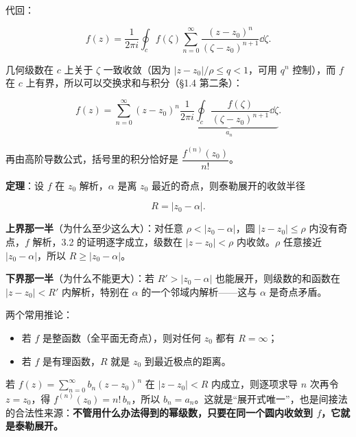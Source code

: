 \documentclass[11pt]{ctexart}
\let\origsubhdr\subhdr
\renewcommand{\subhdr}[1]{\par\needspace{4\baselineskip}\origsubhdr{#1}}
\begin{document}
代回：

\[ f(z)=\frac{1}{2\pi i}\oint_c f(\zeta)\sum_{n=0}^{\infty}\frac{(z-z_0)^n}{(\zeta-z_0)^{n+1}}\dd\zeta . \]

几何级数在 $c$ 上关于 $\zeta$ 一致收敛（因为 $|z-z_0|/\rho\le q<1$，可用 $q^n$ 控制），而 $f$ 在 $c$ 上有界，所以可以交换求和与积分（§1.4 第二条）：

\[ f(z)=\sum_{n=0}^{\infty}(z-z_0)^n\underbrace{\frac{1}{2\pi i}\oint_c\frac{f(\zeta)}{(\zeta-z_0)^{n+1}}\dd\zeta}_{a_n} . \]

再由高阶导数公式，括号里的积分恰好是 $\dfrac{f^{(n)}(z_0)}{n!}$。



\textbf{定理}：设 $f$ 在 $z_0$ 解析，$\alpha$ 是离 $z_0$ 最近的奇点，则泰勒展开的收敛半径

\[ R=|z_0-\alpha| . \]

\textbf{上界那一半}（为什么至少这么大）：对任意 $\rho<|z_0-\alpha|$，圆 $|z-z_0|\le\rho$ 内没有奇点，$f$ 解析，3.2 的证明逐字成立，级数在 $|z-z_0|<\rho$ 内收敛。$\rho$ 任意接近 $|z_0-\alpha|$，所以 $R\ge|z_0-\alpha|$。

\textbf{下界那一半}（为什么不能更大）：若 $R'>|z_0-\alpha|$ 也能展开，则级数的和函数在 $|z-z_0|<R'$ 内解析，特别在 $\alpha$ 的一个邻域内解析——这与 $\alpha$ 是奇点矛盾。


两个常用推论：

\begin{itemize}
\item 若 $f$ 是整函数（全平面无奇点），则对任何 $z_0$ 都有 $R=\infty$；
\item 若 $f$ 是有理函数，$R$ 就是 $z_0$ 到最近极点的距离。
\end{itemize}


若 $f(z)=\sum_{n=0}^{\infty}b_n(z-z_0)^n$ 在 $|z-z_0|<R$ 内成立，则逐项求导 $n$ 次再令 $z=z_0$，得 $f^{(n)}(z_0)=n!\,b_n$，所以 $b_n=a_n$。这就是“展开式唯一”，也是间接法的合法性来源：\textbf{不管用什么办法得到的幂级数，只要在同一个圆内收敛到 $f$，它就是泰勒展开。}
\end{document}
